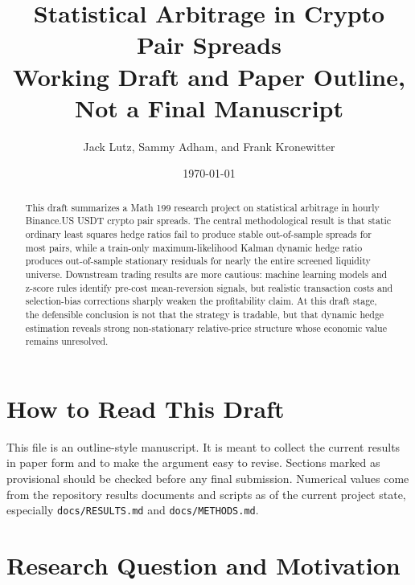 \documentclass[11pt]{article}
\title{Statistical Arbitrage in Crypto Pair Spreads\\
\large Working Draft and Paper Outline, Not a Final Manuscript}
\author{Jack Lutz, Sammy Adham, and Frank Kronewitter}
\date{\today}
\begin{document}
\maketitle

\begin{center}
\end{center}

\begin{abstract}
This draft summarizes a Math 199 research project on statistical arbitrage in
hourly Binance.US USDT crypto pair spreads. The central methodological result
is that static ordinary least squares hedge ratios fail to produce stable
out-of-sample spreads for most pairs, while a train-only maximum-likelihood
Kalman dynamic hedge ratio produces out-of-sample stationary residuals for
nearly the entire screened liquidity universe. Downstream trading results are
more cautious: machine learning models and z-score rules identify pre-cost
mean-reversion signals, but realistic transaction costs and selection-bias
corrections sharply weaken the profitability claim. At this draft stage, the
defensible conclusion is not that the strategy is tradable, but that dynamic
hedge estimation reveals strong non-stationary relative-price structure whose
economic value remains unresolved.
\end{abstract}

\section*{How to Read This Draft}

This file is an outline-style manuscript. It is meant to collect the current
results in paper form and to make the argument easy to revise. Sections marked
as provisional should be checked before any final submission. Numerical values
come from the repository results documents and scripts as of the current
project state, especially \texttt{docs/RESULTS.md} and
\texttt{docs/METHODS.md}.

\section{Research Question and Motivation}
\end{document}
